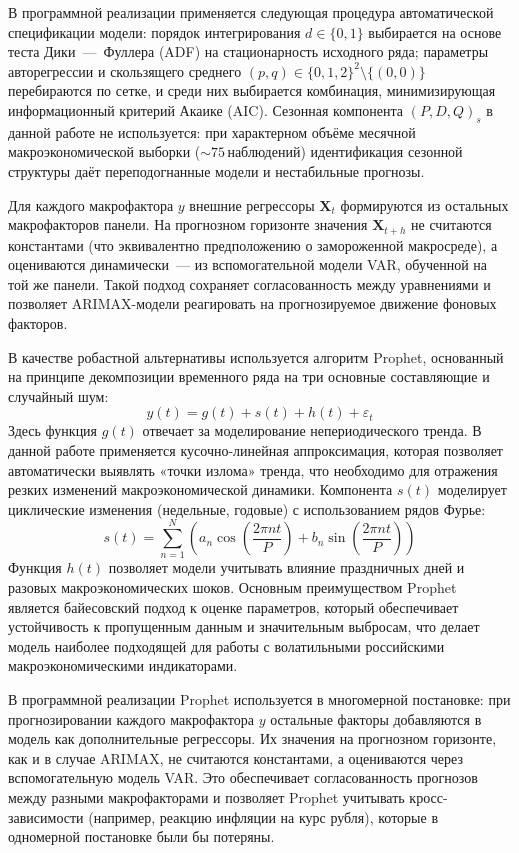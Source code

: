 \documentclass[]{article}
\begin{document}
	В программной реализации применяется следующая процедура автоматической спецификации модели:
	порядок интегрирования $d \in \{0, 1\}$ выбирается на основе теста Дики~---~Фуллера (ADF)
	на стационарность исходного ряда; параметры авторегрессии и скользящего среднего
	$(p, q) \in \{0, 1, 2\}^2 \setminus \{(0, 0)\}$ перебираются по сетке, и среди них
	выбирается комбинация, минимизирующая информационный критерий Акаике (AIC).
	Сезонная компонента $(P, D, Q)_s$ в данной работе не используется: при характерном
	объёме месячной макроэкономической выборки ($\sim 75$\,наблюдений) идентификация
	сезонной структуры даёт переподогнанные модели и нестабильные прогнозы.

	Для каждого макрофактора $y$ внешние регрессоры $\mathbf{X}_t$ формируются из остальных
	макрофакторов панели. На прогнозном горизонте значения $\mathbf{X}_{t+h}$ не считаются
	константами (что эквивалентно предположению о замороженной макросреде), а оцениваются
	динамически~--- из вспомогательной модели VAR, обученной на той же панели. Такой подход
	сохраняет согласованность между уравнениями и позволяет ARIMAX-модели реагировать на
	прогнозируемое движение фоновых факторов.

	В качестве робастной альтернативы используется алгоритм Prophet, основанный на принципе декомпозиции
	временного ряда на три основные составляющие и случайный шум:
	\begin{equation}
		y(t) = g(t) + s(t) + h(t) + \varepsilon_t
	\end{equation}
	Здесь функция $g(t)$ отвечает за моделирование непериодического тренда. В данной работе применяется
	кусочно-линейная аппроксимация, которая позволяет автоматически выявлять «точки излома» тренда, что
	необходимо для отражения резких изменений макроэкономической динамики. Компонента $s(t)$ моделирует
	циклические изменения (недельные, годовые) с использованием рядов Фурье:
	\begin{equation}
		s(t) = \sum_{n=1}^N \left( a_n \cos\left(\frac{2\pi nt}{P}\right) + b_n \sin\left(\frac{2\pi nt}{P}\right) \right)
	\end{equation}
	Функция $h(t)$ позволяет модели учитывать влияние праздничных дней и разовых макроэкономических шоков.
	Основным преимуществом Prophet является байесовский подход к оценке параметров, который обеспечивает
	устойчивость к пропущенным данным и значительным выбросам, что делает модель наиболее подходящей для
	работы с волатильными российскими макроэкономическими индикаторами.

	В программной реализации Prophet используется в многомерной постановке: при прогнозировании
	каждого макрофактора $y$ остальные факторы добавляются в модель как дополнительные регрессоры. Их значения на прогнозном горизонте, как и в случае ARIMAX,
	не считаются константами, а оцениваются через вспомогательную модель VAR. Это обеспечивает
	согласованность прогнозов между разными макрофакторами и позволяет Prophet учитывать
	кросс-зависимости (например, реакцию инфляции на курс рубля), которые в одномерной постановке
	были бы потеряны.
\end{document}
